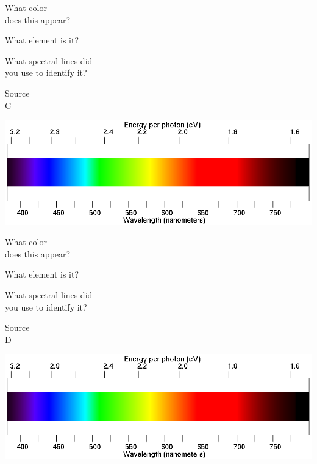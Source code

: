 \documentclass[11pt]{article}
\begin{document}
\begin{minipage}{0.33\textwidth}
	What color \\does this appear?
\end{minipage}
\begin{minipage}{0.33\textwidth}
	What element is it?
\end{minipage}
\begin{minipage}{0.33\textwidth}
	What spectral lines did\\
	you use to identify it?
\end{minipage}

\vspace{1in}
\begin{minipage}{0.1\textwidth}
	\begin{center}
		\Large Source \\ C
	\end{center}
\end{minipage}
\begin{minipage}{0.7\textwidth}
	\includegraphics[width=\textwidth]{spectrum2.png}
\end{minipage}

\begin{minipage}{0.33\textwidth}
	What color \\does this appear?
\end{minipage}
\begin{minipage}{0.33\textwidth}
	What element is it?
\end{minipage}
\begin{minipage}{0.33\textwidth}
	What spectral lines did\\
	you use to identify it?
\end{minipage}

\vspace{1.2in}

\begin{minipage}{0.1\textwidth}
	\begin{center}
		\Large Source \\ D
	\end{center}
\end{minipage}
\begin{minipage}{0.7\textwidth}
	\includegraphics[width=\textwidth]{spectrum2.png}
\end{minipage}
\end{document}
